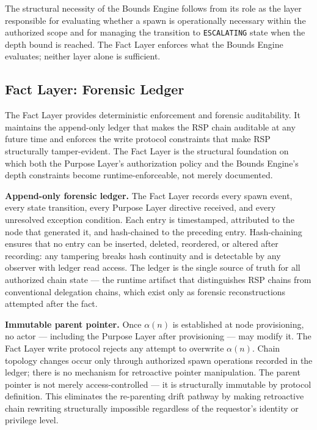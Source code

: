 The structural necessity of the Bounds Engine follows from its role as the layer responsible for evaluating whether a spawn is operationally necessary within the authorized scope and for managing the transition to \texttt{ESCALATING} state when the depth bound is reached. The Fact Layer enforces what the Bounds Engine evaluates; neither layer alone is sufficient.

\subsection{Fact Layer: Forensic Ledger}
\label{sec:rs-fact-ledger}

The Fact Layer provides deterministic enforcement and forensic auditability. It maintains the append-only ledger that makes the RSP chain auditable at any future time and enforces the write protocol constraints that make RSP structurally tamper-evident. The Fact Layer is the structural foundation on which both the Purpose Layer's authorization policy and the Bounds Engine's depth constraints become runtime-enforceable, not merely documented.

\medskip
\noindent\textbf{Append-only forensic ledger.} The Fact Layer records every spawn event, every state transition, every Purpose Layer directive received, and every unresolved exception condition. Each entry is timestamped, attributed to the node that generated it, and hash-chained to the preceding entry. Hash-chaining ensures that no entry can be inserted, deleted, reordered, or altered after recording: any tampering breaks hash continuity and is detectable by any observer with ledger read access. The ledger is the single source of truth for all authorized chain state — the runtime artifact that distinguishes RSP chains from conventional delegation chains, which exist only as forensic reconstructions attempted after the fact.

\medskip
\noindent\textbf{Immutable parent pointer.} Once $\alpha(n)$ is established at node provisioning, no actor — including the Purpose Layer after provisioning — may modify it. The Fact Layer write protocol rejects any attempt to overwrite $\alpha(n)$. Chain topology changes occur only through authorized spawn operations recorded in the ledger; there is no mechanism for retroactive pointer manipulation. The parent pointer is not merely access-controlled — it is structurally immutable by protocol definition. This eliminates the re-parenting drift pathway by making retroactive chain rewriting structurally impossible regardless of the requestor's identity or privilege level.

